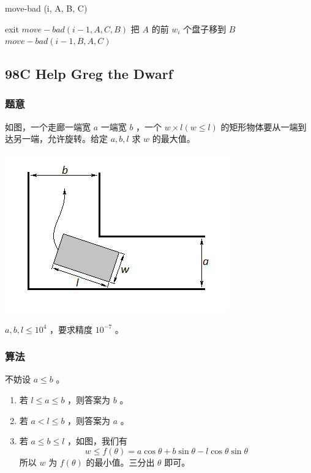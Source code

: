 \documentclass[11pt]{article}
\begin{document}
\begin{algorithm}
  \caption{move-bad (i, A, B, C)}
  \begin{algorithmic}
       \STATE exit
    \ENDIF
    \STATE $move-bad (i - 1, A, C, B)$
    \STATE 把 $A$ 的前 $w_i$ 个盘子移到 $B$
    \STATE $move-bad (i - 1, B, A, C)$
  \end{algorithmic}
\end{algorithm}
\subsection{98C   Help Greg the Dwarf}
\label{sec-7-4}
\subsubsection{题意}
\label{sec-7-4-1}

    如图，一个走廊一端宽 $a$ 一端宽 $b$ ，一个 $w \times l (w \leq l)$ 的矩形物体要从一端到达另一端，允许旋转。给定 $a, b, l$ 求 $w$ 的最大值。

\includegraphics[scale = 0.8]{pic/98C.png}

    $a, b, l \leq 10^4$ ，要求精度 $10^{-7}$ 。
\subsubsection{算法}
\label{sec-7-4-2}

    不妨设 $a \leq b$ 。

\begin{enumerate}
\item 若 $l \leq a \leq b$ ，则答案为 $b$ 。
\item 若 $a < l \leq b$ ，则答案为 $a$ 。
\item 若 $a \leq b \leq l$ ，如图，我们有 $$w \leq f (\theta) = a \cos{\theta} + b \sin{\theta} - l \cos{\theta} \sin{\theta}$$
       所以 $w$ 为 $f(\theta)$ 的最小值。三分出 $\theta$ 即可。
\end{enumerate}
\begin{center}\end{center}
\end{document}

